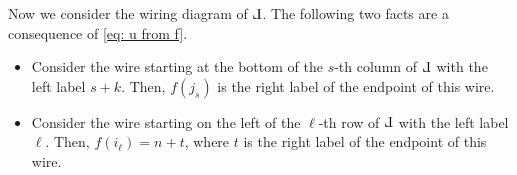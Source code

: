 \documentclass[10pt]{amsart}
\theoremstyle{plain}
\theoremstyle{definition}
\theoremstyle{remark}
\numberwithin{equation}{section}
\def\Le{\reflectbox{$\mathrm{L}$}}
\begin{document}
Now we consider the wiring diagram of $\Le$. %
The following two facts are a consequence of \eqref{eq: u from f}.

\begin{itemize}
\item[(a)] Consider the wire starting at the bottom of the $s$-th column of $\Le$ with the left label $s+k$. Then, $f(j_{s})$ is the right label of the endpoint of this wire.
\item[(b)] Consider the wire starting on the left of the $\ell$-th row of $\Le$ with the left label $\ell$. Then, $f(i_{\ell}) = n + t$, where $t$ is the right label of the endpoint of this wire. 
\end{itemize}
\end{document}
